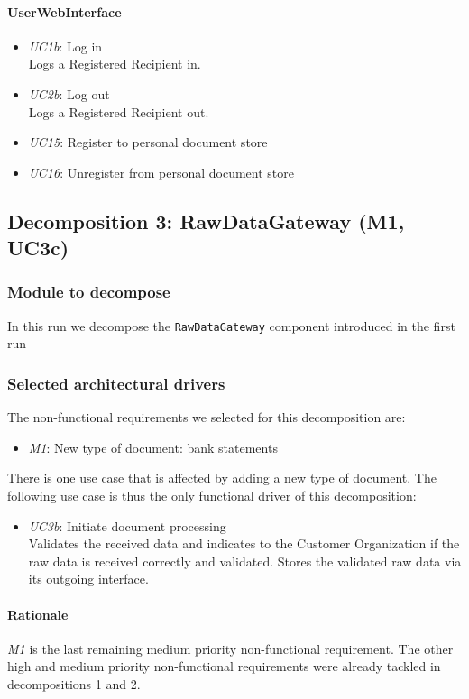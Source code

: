\documentclass[a4paper,10pt]{article}
\begin{document}
\paragraph{UserWebInterface}
\begin{itemize}
	\item \emph{UC1b}: Log in\\ Logs a Registered Recipient in.
    \item \emph{UC2b}: Log out\\ Logs a Registered Recipient out. 
    \item \emph{UC15}: Register to personal document store
    \item \emph{UC16}: Unregister from personal document store
\end{itemize}

\subsection{Decomposition 3: RawDataGateway (M1, UC3c)}
\subsubsection{Module to decompose}
In this run we decompose the \texttt{RawDataGateway} component  introduced in the first run

\subsubsection{Selected architectural drivers}
The non-functional requirements we selected for this decomposition are:
\begin{itemize}
	\item \emph{M1}: New type of document: bank statements
\end{itemize}
There is one use case that is affected by adding a new type of document. The following use case is thus the only functional driver of this decomposition:
\begin{itemize}
	\item \emph{UC3b}: Initiate document processing\\ Validates the received data and indicates to the Customer Organization if the raw data is received correctly and validated. Stores the validated raw data via its outgoing interface.
\end{itemize}

\paragraph{Rationale} \emph{M1} is the last remaining medium priority non-functional requirement. The other high and medium priority non-functional requirements were already tackled in decompositions 1 and 2. 
\end{document}
